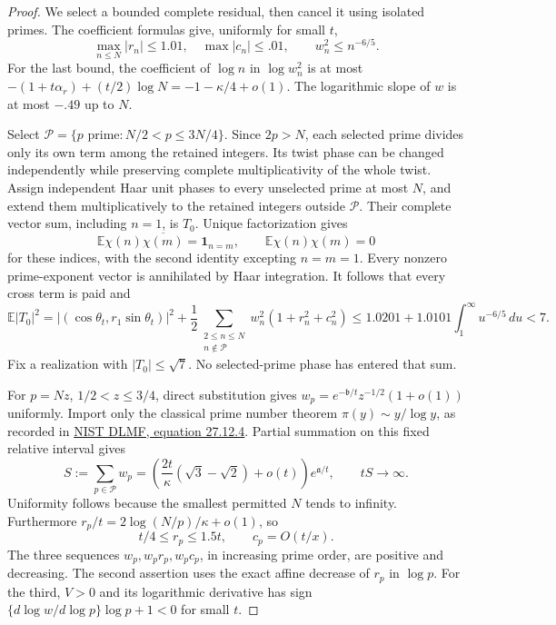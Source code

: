 \documentclass[11pt]{article}
\numberwithin{equation}{section}
\theoremstyle{definition}
\theoremstyle{remark}
\newcommand{\dd}{\,d}
\begin{document}
\begin{proof}
We select a bounded complete residual, then cancel it using isolated
primes. The coefficient formulas give, uniformly for small $t$,
\begin{equation}\label{sc:charactersquarebound}
 \max_{n\le N}|r_n|\le1.01,\quad\max|c_n|\le.01,
 \qquad w_n^2\le n^{-6/5}.
\end{equation}
For the last bound, the coefficient of $\log n$ in $\log w_n^2$ is at
most $-(1+t\alpha_r)+(t/2)\log N=-1-\kappa/4+o(1)$.
The logarithmic slope of $w$ is at most $-.49$ up to $N$.

Select $\mathcal P=\{p\text{ prime}:N/2<p\le3N/4\}$.
Since $2p>N$, each selected prime divides only its own term among the
retained integers. Its twist phase can be changed independently while
preserving complete multiplicativity of the whole twist.
Assign independent Haar unit phases to every unselected prime at most
$N$, and extend them multiplicatively to the retained integers outside
$\mathcal P$. Their complete vector sum, including $n=1$, is $T_0$.
Unique factorization gives
\[
 \mathbb E\chi(n)\overline{\chi(m)}=\mathbf1_{n=m},\qquad
 \mathbb E\chi(n)\chi(m)=0
\]
for these indices, with the second identity excepting $n=m=1$.
Every nonzero prime-exponent vector is annihilated by Haar integration.
It follows that every cross term is paid and
\[
 \mathbb E|T_0|^2
 =|(\cos\theta_t,r_1\sin\theta_t)|^2
 +\frac12\sum_{\substack{2\le n\le N\\n\notin\mathcal P}}
    w_n^2(1+r_n^2+c_n^2)
 \le1.0201+1.0101\int_1^\infty u^{-6/5}\dd u<7.
\]
Fix a realization with $|T_0|\le\sqrt7$. No selected-prime phase has
entered that sum.

For $p=Nz$, $1/2<z\le3/4$, direct substitution gives
$w_p=e^{-\mathfrak b/t}z^{-1/2}(1+o(1))$ uniformly.
Import only the classical prime number theorem
$\pi(y)\sim y/\log y$, as recorded in
\href{https://dlmf.nist.gov/27.12\#E4}{NIST DLMF, equation 27.12.4}.
Partial summation on this fixed relative interval gives
\begin{equation}\label{sc:primereservoir}
 S:=\sum_{p\in\mathcal P}w_p
 =\left(\frac{2t}{\kappa}(\sqrt3-\sqrt2)+o(t)\right)e^{\mathfrak a/t},
 \qquad tS\longrightarrow\infty.
\end{equation}
Uniformity follows because the smallest permitted $N$ tends to infinity.
Furthermore
$r_p/t=2\log(N/p)/\kappa+o(1)$, so
\[
 t/4\le r_p\le1.5t,\qquad c_p=O(t/x).
\]
The three sequences $w_p,w_pr_p,w_pc_p$, in increasing prime order,
are positive and decreasing. The second assertion uses the exact affine
decrease of $r_p$ in $\log p$. For the third, $V>0$ and its
logarithmic derivative has sign
$\{d\log w/d\log p\}\log p+1<0$ for small $t$.


\end{proof}
\end{document}
